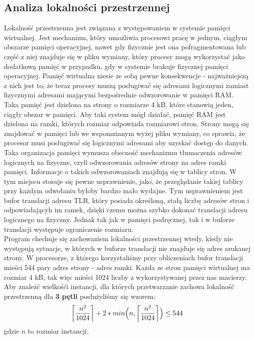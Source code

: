 \documentclass[10pt,a4paper]{article}
\DeclarePairedDelimiter\ceil{\lceil}{\rceil}
\begin{document}
\subsection{Analiza lokalności przestrzennej}
Lokalność przestrzenna jest związana z występowaniem w systemie pamięci wirtualnej.
Jest mechanizm, który umożliwia procesowi pracę w jednym, ciągłym obszarze pamięci operacyjnej,
nawet gdy fizycznie jest ona pofragmentowana lub część z niej znajduje się w pliku wymiany,
który procesy mogą wykorzystać jako dodatkową pamięć w przypadku, gdy w systemie brakuje
fizycznej pamięci operacyjnej. Pamięć wirtualna niesie ze sobą pewne konsekwencje -
najważniejszą z nich jest to, że teraz procesy muszą posługiwać się adresami logicznymi
zamiast fizycznymi adresami mającymi bezpośrednie odwzorowanie w pamięci RAM.
Taka pamięć jest dzielona na strony o rozmiarze 4 kB, które stanowią jeden, ciągły obszar w pamięci.
Aby taki system mógł działać, pamięć RAM jest dzielona na ramki, których rozmiar odpowiada
rozmiarowi stron. Strony mogą się znajdować w pamięci lub we wspomnianym wyżej pliku wymiany,
co sprawia, że procesor musi posługiwać się logicznymi adresami aby uzyskać dostęp do danych.\\

Taka organizacja pamięci wymusza obecność mechanizmu tłumaczenia adresów logicznych
na fizyczne, czyli odwzorowania adresów strony na adres ramki pamięci. Informacje o takich
odwzorowaniach znajdują się w tablicy stron. W tym miejscu stosuje się pewne usprawnienie, jako, że
przeglądanie takiej tablicy przy każdym odwołaniu byłoby bardzo mało wydajne. Tym usprawnieniem
jest bufor translacji adresu TLB, który posiada określoną, stałą liczbę adresów stron i odpowiadającyh
im ramek, dzięki czemu można szybko dokonać translacji adresu logicznego na fizyczny.
Jednak tak jak w pamięci podręcznej, tak i w buforze translacji występuje ograniczenie rozmiaru.\\

Program chechuje się zachowaniem lokalności przestrzennej wtedy, kiedy nie występują sytuacje,
w których w buforze translacji nie znajduje się adres szukanej strony. W procesorze, z którego
korzystaliśmy przy obliczeniach bufor translacji mieści 544 pary adres strony - adres ramki.
Każda ze stron pamięci wirtualnej ma rozmiar 4 kB, tak więc mieści 1024 liczby z wykorzystywanej
przez nas macierzy.\\

Aby znaleźć wielkośći instancji, dla których przetwarzanie zachowa lokalność przestrzenną dla
\textbf{3 pętli} posłużyliśmy się wzorem:
\begin{equation}
	\ceil*{\frac{n^2}{1024}} + 2 * min\Big(n, \ceil*{\frac{n^2}{1024}}\Big) \leq 544
\end{equation}
gdzie $n$ to rozmiar instancji.\\
\end{document}
